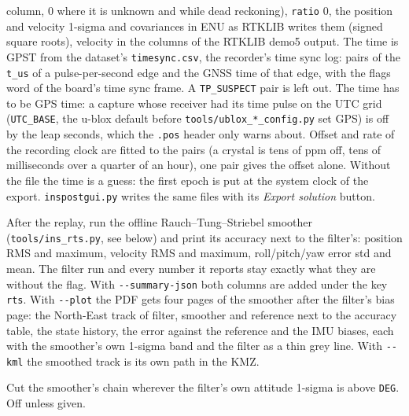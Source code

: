 \documentclass[11pt,a4paper]{article}
\newcommand{\code}[1]{\texttt{#1}}
\begin{document}
\begin{description}
    column, 0 where it is unknown and while dead reckoning),
    \code{ratio} 0, the position and velocity 1-sigma and covariances in
    ENU as RTKLIB writes them (signed square roots), velocity in the
    columns of the RTKLIB demo5 output. The time is GPST from the
    dataset's \code{timesync.csv}, the recorder's time sync log: pairs of
    the \code{t\_us} of a pulse-per-second edge and the GNSS time of that
    edge, with the flags word of the board's time sync frame. A
    \code{TP\_SUSPECT} pair is left out. The time has to be GPS time: a
    capture whose receiver had its time pulse on the UTC grid
    (\code{UTC\_BASE}, the u-blox default before
    \code{tools/\allowbreak{}ublox\_*\_config.py} set GPS) is off by the
    leap seconds, which the \code{.pos} header only warns about. Offset and rate of the recording
    clock are fitted to the pairs (a crystal is tens of ppm off, tens of
    milliseconds over a quarter of an hour), one pair gives the offset
    alone. Without the file the time is a guess: the first epoch is put at
    the system clock of the export. \code{inspostgui.py}
    writes the same files with its \emph{Export solution} button.
  \item[\code{-{}-smooth}] After the replay, run the offline
    Rauch--Tung--Striebel smoother (\code{tools/\allowbreak{}ins\_\allowbreak{}rts.py},
    see below) and print its accuracy next to the filter's: position RMS and
    maximum, velocity RMS and maximum, roll/pitch/yaw error std and mean.
    The filter run and every number it reports stay exactly what they are
    without the flag. With \code{-{}-summary-json} both columns are added
    under the key \code{rts}. With \code{-{}-plot} the PDF gets four pages
    of the smoother after the filter's bias page: the North-East track of
    filter, smoother and reference next to the accuracy table, the state
    history, the error against the reference and the IMU biases, each
    with the smoother's own 1-sigma band and the filter as a thin grey
    line. With \code{-{}-kml} the smoothed track is its own path in the
    KMZ.
  \item[\code{-{}-smooth-att-sd-max DEG}] Cut the smoother's chain wherever
    the filter's own attitude 1-sigma is above \code{DEG}. Off unless given.
\end{description}
\end{document}
